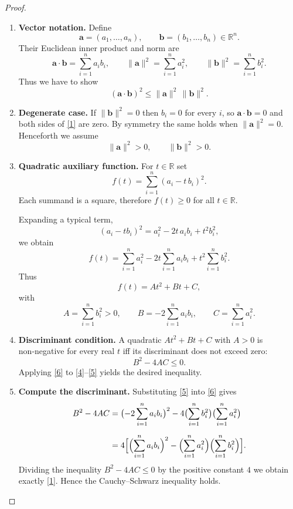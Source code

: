 \begin{proof}
\begin{enumerate}
\item \textbf{Vector notation.}  
Define  
\[
\mathbf a=(a_{1},\dots ,a_{n}),\qquad 
\mathbf b=(b_{1},\dots ,b_{n})\in\mathbb R^{n}.
\]  
Their Euclidean inner product and norm are  
\[
\mathbf a\cdot\mathbf b=\sum_{i=1}^{n}a_{i}b_{i},\qquad 
\|\mathbf a\|^{2}= \sum_{i=1}^{n}a_{i}^{2},\qquad 
\|\mathbf b\|^{2}= \sum_{i=1}^{n}b_{i}^{2}.
\]  
Thus we have to show  
\begin{equation}
(\mathbf a\cdot\mathbf b)^{2}\le \|\mathbf a\|^{2}\,\|\mathbf b\|^{2}.
\tag{1}
\end{equation}

\item \textbf{Degenerate case.}  
If $\|\mathbf b\|^{2}=0$ then $b_{i}=0$ for every $i$, so $\mathbf a\cdot\mathbf b=0$ and both sides of \eqref{1} are zero.  
By symmetry the same holds when $\|\mathbf a\|^{2}=0$.  
Henceforth we assume  
\begin{equation}
\|\mathbf a\|^{2}>0,\qquad \|\mathbf b\|^{2}>0.
\tag{2}
\end{equation}

\item \textbf{Quadratic auxiliary function.}  
For $t\in\mathbb R$ set  
\begin{equation}
f(t)=\sum_{i=1}^{n}(a_{i}-t\,b_{i})^{2}.
\tag{3}
\end{equation}  
Each summand is a square, therefore $f(t)\ge0$ for all $t\in\mathbb R$.

Expanding a typical term,
\[
(a_{i}-t b_{i})^{2}=a_{i}^{2}-2t\,a_{i}b_{i}+t^{2}b_{i}^{2},
\]
we obtain  
\[
f(t)=\sum_{i=1}^{n}a_{i}^{2}
      -2t\sum_{i=1}^{n}a_{i}b_{i}
      +t^{2}\sum_{i=1}^{n}b_{i}^{2}.
\]  
Thus  
\begin{equation}
f(t)=A t^{2}+B t+C,
\tag{4}
\end{equation}
with  
\[
A=\sum_{i=1}^{n}b_{i}^{2}>0,\qquad
B=-2\sum_{i=1}^{n}a_{i}b_{i},\qquad
C=\sum_{i=1}^{n}a_{i}^{2}.
\tag{5}
\]

\item \textbf{Discriminant condition.}  
A quadratic $A t^{2}+B t+C$ with $A>0$ is non‑negative for every real $t$ iff its discriminant does not exceed zero:
\begin{equation}
B^{2}-4AC\le0.
\tag{6}
\end{equation}
Applying \eqref{6} to \eqref{4}–\eqref{5} yields the desired inequality.

\item \textbf{Compute the discriminant.}  
Substituting \eqref{5} into \eqref{6} gives  
\begin{align*}
B^{2}-4AC
&=\bigl(-2\sum_{i=1}^{n}a_{i}b_{i}\bigr)^{2}
  -4\bigl(\sum_{i=1}^{n}b_{i}^{2}\bigr)\bigl(\sum_{i=1}^{n}a_{i}^{2}\bigr)\\[2mm]
&=4\Bigl[\Bigl(\sum_{i=1}^{n}a_{i}b_{i}\Bigr)^{2}
          -\Bigl(\sum_{i=1}^{n}a_{i}^{2}\Bigr)
           \Bigl(\sum_{i=1}^{n}b_{i}^{2}\Bigr)\Bigr].
\end{align*}
Dividing the inequality $B^{2}-4AC\le0$ by the positive constant $4$ we obtain exactly \eqref{1}.  
Hence the Cauchy–Schwarz inequality holds.


\end{enumerate}
\end{proof}
